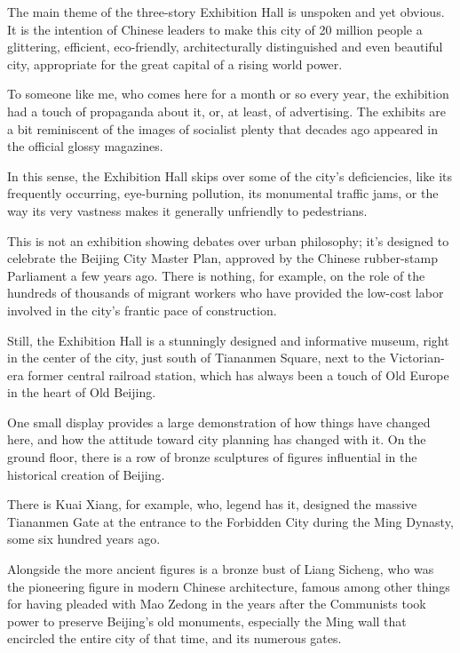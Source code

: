 ﻿\documentclass[12pt]{article}
\begin{document}
The main theme of the three-story Exhibition Hall is unspoken and yet obvious. It is the intention
of Chinese leaders to make this city of 20 million people a glittering, efficient, eco-friendly,
architecturally distinguished and even beautiful city, appropriate for the great capital of a rising
world power.

To someone like me, who comes here for a month or so every year, the exhibition had a touch of
propaganda about it, or, at least, of advertising. The exhibits are a bit reminiscent of the images
of socialist plenty that decades ago appeared in the official glossy magazines.

In this sense, the Exhibition Hall skips over some of the city's deficiencies, like its frequently
occurring, eye-burning pollution, its monumental traffic jams, or the way its very vastness makes it
generally unfriendly to pedestrians.

This is not an exhibition showing debates over urban philosophy; it's designed to celebrate the
Beijing City Master Plan, approved by the Chinese rubber-stamp Parliament a few years ago. There is
nothing, for example, on the role of the hundreds of thousands of migrant workers who have provided
the low-cost labor involved in the city's frantic pace of construction.

Still, the Exhibition Hall is a stunningly designed and informative museum, right in the center of
the city, just south of Tiananmen Square, next to the Victorian-era former central railroad station,
which has always been a touch of Old Europe in the heart of Old Beijing.

One small display provides a large demonstration of how things have changed here, and how the
attitude toward city planning has changed with it. On the ground floor, there is a row of bronze
sculptures of figures influential in the historical creation of Beijing.

There is Kuai Xiang, for example, who, legend has it, designed the massive Tiananmen Gate at the
entrance to the Forbidden City during the Ming Dynasty, some six hundred years ago.

Alongside the more ancient figures is a bronze bust of Liang Sicheng, who was the pioneering figure
in modern Chinese architecture, famous among other things for having pleaded with Mao Zedong in the
years after the Communists took power to preserve Beijing's old monuments, especially the Ming wall
that encircled the entire city of that time, and its numerous gates.
\end{document}
